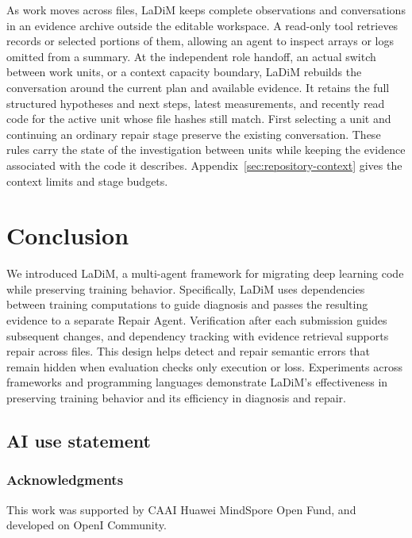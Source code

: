 \documentclass{article}
\begin{document}
As work moves across files, LaDiM keeps complete observations and conversations in an evidence archive outside the editable workspace. A read-only tool retrieves records or selected portions of them, allowing an agent to inspect arrays or logs omitted from a summary. At the independent role handoff, an actual switch between work units, or a context capacity boundary, LaDiM rebuilds the conversation around the current plan and available evidence. It retains the full structured hypotheses and next steps, latest measurements, and recently read code for the active unit whose file hashes still match. First selecting a unit and continuing an ordinary repair stage preserve the existing conversation. These rules carry the state of the investigation between units while keeping the evidence associated with the code it describes. Appendix~\ref{sec:repository-context} gives the context limits and stage budgets.



\section{Conclusion}

We introduced LaDiM, a multi-agent framework for migrating deep learning code while preserving training behavior. Specifically, LaDiM uses dependencies between training computations to guide diagnosis and passes the resulting evidence to a separate Repair Agent. Verification after each submission guides subsequent changes, and dependency tracking with evidence retrieval supports repair across files. This design helps detect and repair semantic errors that remain hidden when evaluation checks only execution or loss. Experiments across frameworks and programming languages demonstrate LaDiM's effectiveness in preserving training behavior and its efficiency in diagnosis and repair.

\subsection*{AI use statement}

\ificlrfinal
\subsubsection*{Acknowledgments}
This work was supported by CAAI Huawei MindSpore Open Fund, and developed on OpenI Community.
\fi




\clearpage
\appendix

\end{document}
